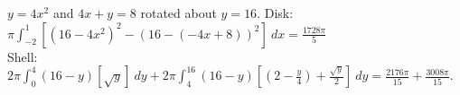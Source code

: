 {$y=4x^2$ and $4x+y=8$ rotated about $y=16$.}
{\noindent Disk: $\pi \int_{-2}^1\left[(16-4x^2)^2-(16-(-4x+8))^2\right]\ dx=\frac{1728\pi}{5}$\\
Shell: $2\pi \int_0^4 (16-y)\left[\sqrt y\right]\ dy
+2\pi \int_4^{16} (16-y)\left[\left(2-\frac y4\right)+\frac{\sqrt y}2\right]\ dy
=\frac{2176\pi}{15}+\frac{3008\pi}{15}$.}
